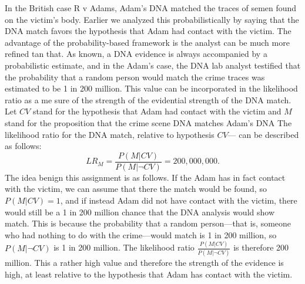 \documentclass[10pt]{article}
\begin{document}
In the British case R v Adams, Adam's DNA matched the traces 
of semen found on the victim's body.
Earlier we analyzed this probabilistically by saying that the DNA match favors 
the hypothesis that Adam had contact with the victim. The advantage of the probability-based framework is the analyst can be much more refined tan that. 
As known, a DNA evidence is always accompanied by a probabilistic estimate, and in the Adam's case, the DNA lab analyst testified that 
the probability that a random person would match the crime traces was estimated to be 1 in 200 million. This value can 
be incorporated in the likelihood ratio as a me sure of the strength of the evidential strength of the DNA match. 
Let $CV$ stand for the hypothesis that Adam had 
contact with the victim and $M$ stand for the 
proposition that the crime scene DNA matches Adam's DNA
The likelihood ratio for the DNA match, relative to hypothesis $CV$---
can be described as follows:
%
\[LR_M=\frac{P(M| CV)}{P(M| \neg CV)}=200,000,000.\]
%
The idea benign this assignment is as follows. If the Adam has in fact contact with the victim, we can assume that there the match would be found, so 
$P(M| CV)=1$, and if instead Adam did not have contact with the victim, there would still be a 1 in 200 million chance that the DNA 
analysis would show match. This is because the probability that a random person---that is, someone who 
had nothing to do with the crime---would match is 1 in 200 million, so $P(M| \neg CV)$ is 1 in 200 million. 
The likelihood ratio $\frac{P(M| CV)}{P(M| \neg CV)}$ is therefore 200 million. This a rather high value 
and therefore the strength of the evidence is high, at least relative to the hypothesis that Adam has contact with the victim.
\end{document}
